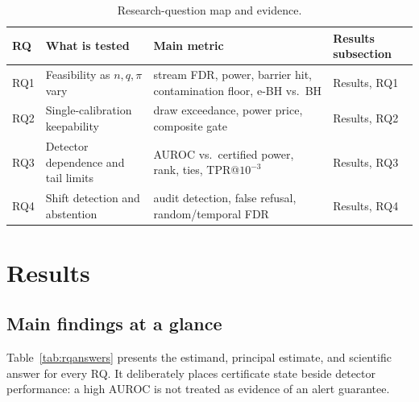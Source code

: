 \documentclass[a4paper,fleqn]{cas-dc}
\begin{document}
\begin{table}[t]
\centering
\caption{Research-question map and evidence.}
\label{tab:rqmap}
\scriptsize
\setlength{\tabcolsep}{2.2pt}
\begin{tabularx}{\linewidth}{L{0.40}L{1.10}L{1.40}L{1.10}}
\toprule
RQ & What is tested & Main metric & Results subsection \\
\midrule
RQ1 & Feasibility as $n,q,\pi$ vary & stream FDR, power, barrier hit, contamination floor, e-BH vs.\ BH & Results, RQ1 \\
RQ2 & Single-calibration keepability & draw exceedance, power price, composite gate & Results, RQ2 \\
RQ3 & Detector dependence and tail limits & AUROC vs.\ certified power, rank, ties, TPR@$10^{-3}$ & Results, RQ3 \\
RQ4 & Shift detection and abstention & audit detection, false refusal, random/temporal FDR & Results, RQ4 \\
\bottomrule
\end{tabularx}
\end{table}

\section{Results}
\label{sec:results}

\subsection{Main findings at a glance}
Table~\ref{tab:rqanswers} presents the estimand, principal estimate, and scientific answer for every RQ. It deliberately places certificate state beside detector performance: a high AUROC is not treated as evidence of an alert guarantee.
\end{document}
